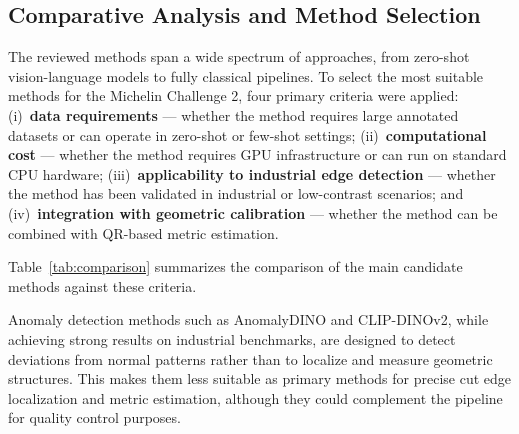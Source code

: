 \documentclass[11pt]{article}
\begin{document}
\subsection*{Comparative Analysis and Method Selection}

The reviewed methods span a wide spectrum of approaches, from zero-shot
vision-language models to fully classical pipelines. To select the most suitable
methods for the Michelin Challenge 2, four primary criteria were applied:
(i)~\textbf{data requirements} --- whether the method requires large annotated
datasets or can operate in zero-shot or few-shot settings;
(ii)~\textbf{computational cost} --- whether the method requires GPU
infrastructure or can run on standard CPU hardware;
(iii)~\textbf{applicability to industrial edge detection} --- whether the method
has been validated in industrial or low-contrast scenarios; and
(iv)~\textbf{integration with geometric calibration} --- whether the method can
be combined with QR-based metric estimation.

Table~\ref{tab:comparison} summarizes the comparison of the main candidate
methods against these criteria.

\begin{table}[ht]
\centering
{}
\caption{Comparison of candidate methods against the main selection criteria
for the Michelin Challenge 2.}
\label{tab:comparison}
\end{table}

Anomaly detection methods such as AnomalyDINO and CLIP-DINOv2, while achieving
strong results on industrial benchmarks, are designed to detect deviations from
normal patterns rather than to localize and measure geometric structures. This
makes them less suitable as primary methods for precise cut edge localization and
metric estimation, although they could complement the pipeline for quality control
purposes.\\
\end{document}
